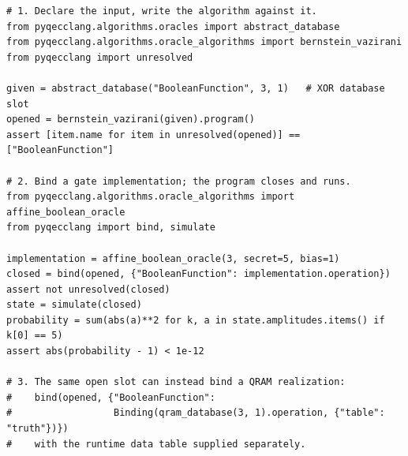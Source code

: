\begin{lstlisting}[style=pyqpython, caption={The oracle lifecycle on Bernstein--Vazirani (verbatim from the doctested tutorial).  The algorithm is written and \emph{simulable} only after binding; the same open program later binds a QRAM realization instead of the gate network.}, label={lst:bv}]
# 1. Declare the input, write the algorithm against it.
from pyqecclang.algorithms.oracles import abstract_database
from pyqecclang.algorithms.oracle_algorithms import bernstein_vazirani
from pyqecclang import unresolved

given = abstract_database("BooleanFunction", 3, 1)   # XOR database slot
opened = bernstein_vazirani(given).program()
assert [item.name for item in unresolved(opened)] == ["BooleanFunction"]

# 2. Bind a gate implementation; the program closes and runs.
from pyqecclang.algorithms.oracle_algorithms import affine_boolean_oracle
from pyqecclang import bind, simulate

implementation = affine_boolean_oracle(3, secret=5, bias=1)
closed = bind(opened, {"BooleanFunction": implementation.operation})
assert not unresolved(closed)
state = simulate(closed)
probability = sum(abs(a)**2 for k, a in state.amplitudes.items() if k[0] == 5)
assert abs(probability - 1) < 1e-12

# 3. The same open slot can instead bind a QRAM realization:
#    bind(opened, {"BooleanFunction":
#                  Binding(qram_database(3, 1).operation, {"table": "truth"})})
#    with the runtime data table supplied separately.
\end{lstlisting}

